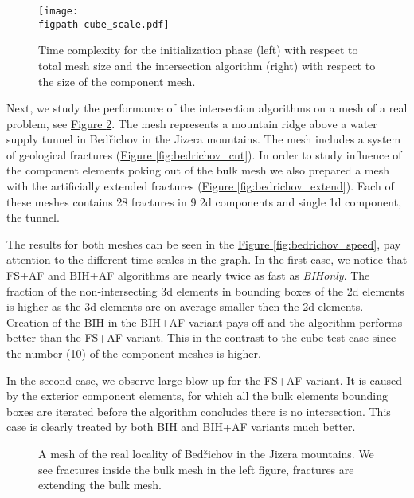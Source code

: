\documentclass{elsarticle}
\newcommand{\fig}[1]{\hyperref[#1]{Figure \ref{#1}}}
\newcommand{\figpath}{figures/}
\begin{document}
\begin{figure}[!htb]
    \centering
    \texttt{[image: \\figpath cube\_scale.pdf]}
    \caption{Time complexity for the initialization phase (left) with respect to total mesh size and the intersection algorithm (right) with respect to the size of the component mesh.}
    \label{fig:cube_speed}
\end{figure}



Next, we study the performance of the intersection algorithms on a mesh of a real problem, see \fig{fig:bedrichov_meshes}.
The mesh represents a mountain ridge above a water supply tunnel in Bed{\v r}ichov in the Jizera mountains.
The mesh includes a system of geological fractures (\fig{fig:bedrichov_cut}). In order to study influence of the component elements poking out of
the bulk mesh we also prepared a mesh with the artificially extended fractures (\fig{fig:bedrichov_extend}). 
Each of these meshes contains 28 fractures in 9 2d components and single 1d component, the tunnel.

The results for both meshes can be seen in the \fig{fig:bedrichov_speed}, pay attention to the different time
scales in the graph. In the first case, we notice that FS+AF and BIH+AF algorithms are nearly twice as fast as \emph{BIHonly}.
The fraction of the non-intersecting 3d elements in bounding boxes of the 2d elements is higher as the 3d elements are on average smaller then the 2d elements.
Creation of the BIH in the BIH+AF variant pays off and the algorithm performs better than the FS+AF variant.
This in the contrast to the cube test case since the number (10) of the component meshes is higher.

In the second case, we observe large blow up for the FS+AF variant. It is caused by the exterior component elements, 
for which all the bulk elements bounding boxes are iterated before the algorithm concludes there is no intersection.
This case is clearly treated by both BIH and BIH+AF variants much better.



\begin{figure}[!htb]
    \hspace{3pt}
    \caption{A mesh of the real locality of Bed{\v r}ichov in the Jizera mountains.
             We see fractures inside the bulk mesh in the left figure,
             fractures are extending the bulk mesh.}
    \label{fig:bedrichov_meshes}
\end{figure}
\end{document}
